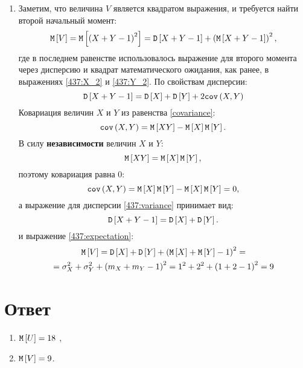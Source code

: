 \begin{enumerate}
    \item Заметим, что величина $V$ является квадратом выражения, и требуется найти второй начальный момент:
    \begin{equation}
        \label{437:expectation}
        \mathtt{M} \left [ V \right ] = \mathtt{M} \left [ \left ( X + Y - 1 \right )^2 \right ] = \mathtt{D} \left [ X + Y - 1 \right ] + \left ( \mathtt{M} \left [ X + Y - 1 \right ] \right )^2 ,
    \end{equation}
    где в последнем равенстве использовалось выражение для второго момента через дисперсию и квадрат математического ожидания, как ранее, в выражениях \eqref{437:X_2}
    и \eqref{437:Y_2}.
    По свойствам дисперсии:
    \begin{equation}
        \label{437:variance}
        \mathtt{D} \left [ X + Y - 1 \right ] = \mathtt{D} \left [ X \right ] + \mathtt{D} \left [ Y \right ] + 2 \texttt{cov} \left ( X , Y \right )
    \end{equation}
    Ковариация величин $X$ и $Y$ из равенства \eqref{covariance}:
    \begin{equation}
        \texttt{cov} \left ( X , Y \right ) = \mathtt{M} \left [ XY \right ] - \mathtt{M} \left [ X \right ] \mathtt{M} \left [ Y \right ].
    \end{equation}
    В силу \textbf{независимости} величин $X$ и $Y$:
    \begin{equation}
        \mathtt{M} \left [ XY \right ] = \mathtt{M} \left [ X \right ] \mathtt{M} \left [ Y \right ] ,
    \end{equation}
    поэтому ковариация равна 0:
    \begin{equation}
        \texttt{cov} \left ( X , Y \right ) = \mathtt{M} \left [ X \right ] \mathtt{M} \left [ Y \right ] - \mathtt{M} \left [ X \right ] \mathtt{M} \left [ Y \right ] = 0 ,
    \end{equation}
    а выражение для дисперсии \eqref{437:variance} принимает вид:
    \begin{equation}
        \mathtt{D} \left [ X + Y - 1 \right ] = \mathtt{D} \left [ X \right ] + \mathtt{D} \left [ Y \right ] .
    \end{equation}
    и выражение \eqref{437:expectation}:
    \begin{multline}
        \mathtt{M} \left [ V \right ]
        = \mathtt{D} \left [ X \right ] + \mathtt{D} \left [ Y \right ] + \left ( \mathtt{M} \left [ X \right ] + \mathtt{M} \left [ Y \right ] - 1 \right )^2 = \\
        = \sigma_X^2 + \sigma_Y^2 + \left ( m_X + m_Y - 1 \right )^2
        = 1^2
        + 2^2 + \left ( 1 + 2 - 1 \right )^2
        = 9
    \end{multline}
\end{enumerate}
\section*{Ответ}
\begin{enumerate}
    \item $\mathtt{M} \left [ U \right ] = 18$ ,
    \item $\mathtt{M} \left [ V \right ] = 9$.
\end{enumerate}


